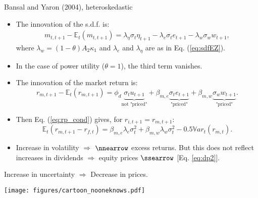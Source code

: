 \begin{frame}{Bansal and Yaron (2004), heteroskedastic}
\begin{footnotesize}
\begin{itemize}
	\item The innovation of the s.d.f. is:
	\begin{eqnarray}\label{eq:mBY2}
 m_{t,t+1} - \mathbb{E}_t(m_{t,t+1}) = \lambda_{\eta} \sigma_t \eta_{t+1} - \lambda_{e} \sigma_t e_{t+1} - \lambda_{w} \sigma_w w_{t+1},
	\end{eqnarray}
	where $ \lambda_{w} = (1-\theta)A_2 \kappa_1$ and $\lambda_e$ and $\lambda_\eta$ are as in Eq. (\ref{eq:sdfEZ}).
	\item In the case of power utility ($\theta = 1$), the third term vanishes.
	\item The innovation of the market return is:
	\begin{equation}\label{eq:rmErmHetero}
	r_{m,t+1} - \mathbb{E}_t(r_{m,t+1}) = \phi_d  \underbrace{\sigma_t u_{t+1}}_{\mbox{not "priced"}} + \beta_{m,e}  \underbrace{ \sigma_t e_{t+1}}_{\mbox{"priced"}} + \beta_{m,w}  \underbrace{ \sigma_w w_{t+1}}_{\mbox{"priced"}}.
	\end{equation}
		\item Then Eq. (\ref{eq:rp_cond}) gives, for $r_{i,t+1}=r_{m,t+1}$:
	\begin{equation}\label{eq:xsBYhetero}
	\mathbb{E}_t(r_{m,t+1} - r_{f,t}) = \beta_{m,e}\lambda_{e} \sigma_t^2 + \beta_{m,w}\lambda_{w} \sigma_t^2 - 0.5 \mathbb{V}ar_t(r_{m,t}).
	\end{equation}
	\item Increase in volatility $\Rightarrow$ $\nnearrow$ excess returns. But this does not reflect increases in dividends $\Rightarrow$ equity prices $\ssearrow$ [Eq. \ref{eq:dp2}].
\end{itemize}
\end{footnotesize}
\end{frame}


\begin{frame}
	\begin{center}
	\begin{footnotesize}
	Increase in uncertainty $\Rightarrow$ Decrease in prices.
	\end{footnotesize}
	
	\vspace{.4cm}

	\texttt{[image: figures/cartoon\_nooneknows.pdf]}
	\end{center}
\end{frame}


